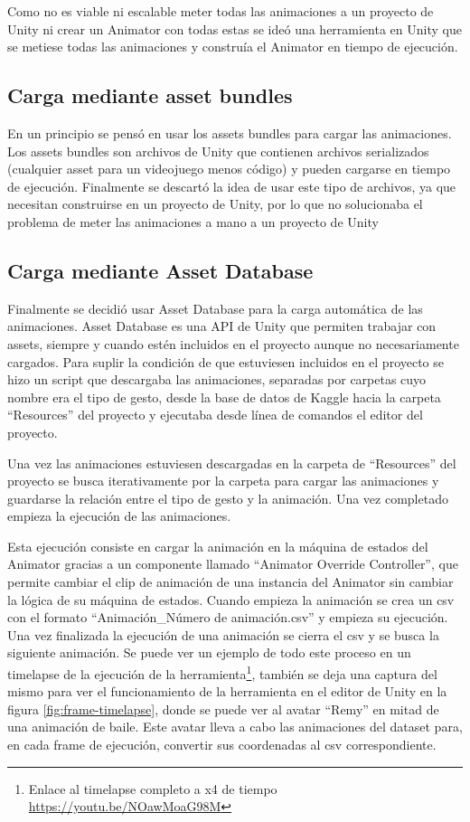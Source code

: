 Como no es viable ni escalable meter todas las animaciones a un proyecto de Unity ni crear un \gls{Animator} con todas estas se ideó una herramienta en Unity que se metiese todas las animaciones y construía el Animator en tiempo de ejecución.

\subsection{Carga mediante asset bundles}
En un principio se pensó en usar los assets bundles para cargar las animaciones.
Los assets bundles son archivos de Unity que contienen archivos serializados (cualquier asset para un videojuego menos código) y pueden cargarse en tiempo de ejecución.
Finalmente se descartó la idea de usar este tipo de archivos, ya que necesitan construirse en un proyecto de Unity, por lo que no solucionaba el problema de meter las animaciones a mano a un proyecto de Unity

\subsection{Carga mediante Asset Database}
Finalmente se decidió usar Asset Database para la carga automática de las animaciones.
Asset Database es una API de Unity que permiten trabajar con assets, siempre y cuando estén incluidos en el proyecto aunque no necesariamente cargados.
Para suplir la condición de que estuviesen incluidos en el proyecto se hizo un script que descargaba las animaciones, separadas por carpetas cuyo nombre era el tipo de gesto, desde la base de datos de Kaggle hacia la carpeta ``Resources'' del proyecto y ejecutaba desde línea de comandos el editor del proyecto.

Una vez las animaciones estuviesen descargadas en la carpeta de ``Resources'' del proyecto se busca iterativamente por la carpeta para cargar las animaciones y guardarse la relación entre el tipo de gesto y la animación.
Una vez completado empieza la ejecución de las animaciones.

Esta ejecución consiste en cargar la animación en la máquina de estados del \gls{Animator} gracias a un componente llamado ``Animator Override Controller'', que permite cambiar el clip de animación de una instancia del \gls{Animator} sin cambiar la lógica de su máquina de estados.
Cuando empieza la animación se crea un \gls{csv} con el formato ``Animación\_Número de animación.csv'' y empieza su ejecución.
Una vez finalizada la ejecución de una animación se cierra el \gls{csv} y se busca la siguiente animación. Se puede ver un ejemplo de todo este proceso en un timelapse de la ejecución de la herramienta\footnote{Enlace al timelapse completo a x4 de tiempo \url{https://youtu.be/NOawMoaG98M}}, también se deja una captura del mismo para ver el funcionamiento de la herramienta en el editor de Unity en la figura \ref{fig:frame-timelapse}, donde se puede ver al avatar ``Remy'' en mitad de una animación de baile. Este avatar lleva a cabo las animaciones del dataset para, en cada frame de ejecución, convertir sus coordenadas al \gls{csv} correspondiente.

